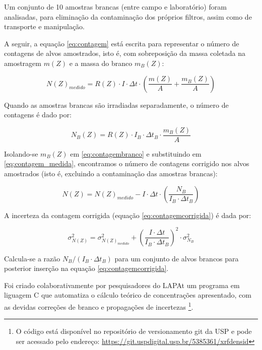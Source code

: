 Um conjunto de 10 amostras brancas (entre campo e laboratório) foram analisadas, 
para eliminação da contaminação dos próprios filtros, assim como de 
transporte e manipulação.

A seguir, a equação \ref{eq:contagem} está escrita para representar o número de contagens de alvos amostrados, isto é, com sobreposição da massa coletada na amostragem $m(Z)$ e a massa do branco $m_B(Z)$: 

\begin{equation}
  \label{eq:contagem_medida}
  N(Z)_{medido} = R(Z) \cdot I \cdot \Delta t \cdot \left( \frac{m(Z)}{A} + \frac{m_B(Z)}{A} \right)
\end{equation}  

Quando as amostras brancas são irradiadas separadamente, o número de contagens é dado por:

\begin{equation}
  \label{eq:contagembranco}
  N_B(Z) = R(Z) \cdot I_B \cdot \Delta t_B \cdot \frac{m_B(Z)}{A}
\end{equation}

Isolando-se $m_B(Z)$ em \ref{eq:contagembranco} e substituindo em 
\ref{eq:contagem_medida}, encontramos o número de contagens corrigido nos alvos amostrados
(isto é, excluindo a contaminação das amostras brancas):
 
\begin{equation}
  \label{eq:contagemcorrigida}
  N(Z) = N(Z)_{medido} - I \cdot \Delta t \cdot \left( \frac{N_B}{I_B \cdot \Delta t_B}  \right)
\end{equation}

A incerteza da contagem corrigida (equação \ref{eq:contagemcorrigida}) é dada por:

\begin{equation}
  \label{eq:erro_contagemcorrigida}
  \sigma_{N(Z)}^2 = \sigma_{N(Z)_{medido}}^2 + \left( \frac{I \cdot \Delta t}{I_B \cdot \Delta t_B} \right)^2 \cdot \sigma_{N_B}^2
\end{equation}

Calcula-se a razão $N_B/(I_B \cdot \Delta t_B)$ para um conjunto de alvos brancos para 
posterior inserção na equação \ref{eq:contagemcorrigida}.

Foi criado colaborativamente por pesquisadores do LAPAt um programa 
em liguagem C que automatiza o cálculo teórico de concentrações apresentado, 
com as devidas correções de branco e propagações de incertezas \footnote{
O código está disponível no repositório de versionamento git da USP 
e pode ser acessado pelo endereço: 
\url{https://git.uspdigital.usp.br/5385361/xrfdensid}}.

